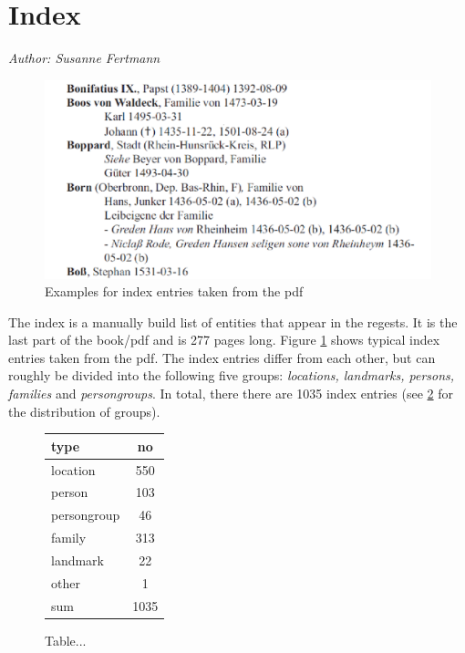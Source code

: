 \section{Index}
\label{sec:index}

\emph{Author: Susanne Fertmann} \\

\begin{figure}[h]
  \centering
  \includegraphics[scale=0.3]{img/index-examples}
  \caption{Examples for index entries taken from the pdf}
  \label{fig:index-examples}
\end{figure}
The index is a manually build list of entities that appear in the regests. It is the last part of the book/pdf and is 277 pages long. Figure \ref{fig:index-examples} shows typical index entries taken from the pdf. The index entries differ from each other, but can roughly be divided into the following five groups: \textit{locations, landmarks, persons, families} and \textit{persongroups}. In total, there there are 1035 index entries (see \ref{fig:type-table} for the distribution of groups). 

\begin{figure}[h]
\centering
\begin{tabular}{|l|c|}
\hline
type        & no  \\
\hline
location    & 550 \\
person      & 103 \\
persongroup & 46  \\
family      & 313 \\
landmark    & 22  \\
other       & 1   \\
\hline
sum         & 1035\\
\hline
\end{tabular} 
\caption{Table...}
\label{fig:type-table}
\end{figure}

